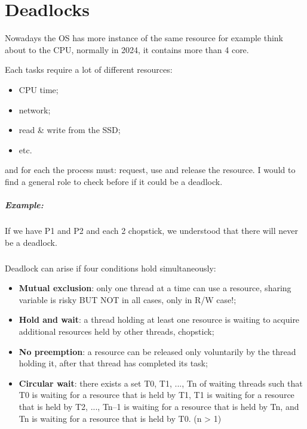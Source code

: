 \chapter{Deadlocks}
Nowadays the OS has more instance of the same resource for example think about to the CPU, normally in 2024, it contains more than 4 core.

Each tasks require a lot of different resources: 

\begin{itemize}
    \item CPU time;
    \item network;
    \item read \& write from the SSD;
    \item etc.
\end{itemize}

and for each the process must: request, use and release the resource. I would to find a general role to check before if it could be a deadlock.

\paragraph{Example: } If we have P1 and P2 and each 2 chopstick, we understood that there will never be a deadlock.

\paragraph{}

Deadlock can arise if four conditions hold simultaneously:


\begin{itemize}
    \item \textbf{Mutual exclusion}: only one thread at a time can use a resource, sharing variable is risky BUT NOT in all cases, only in R/W case!;
    \item \textbf{Hold and wait}: a thread holding at least one resource is waiting to acquire additional resources held by other threads, chopstick;
    \item \textbf{No preemption}: a resource can be released only voluntarily by the thread holding it, after that thread has completed its task;
    \item \textbf{Circular wait}: there exists a set {T0, T1, ..., Tn} of waiting threads such that T0 is waiting for a resource that is held by T1, T1 is waiting for a resource that is held by T2, ..., Tn–1 is waiting for a resource that is held by Tn, and Tn is waiting for a resource that is held by T0. (n > 1)
\end{itemize}

